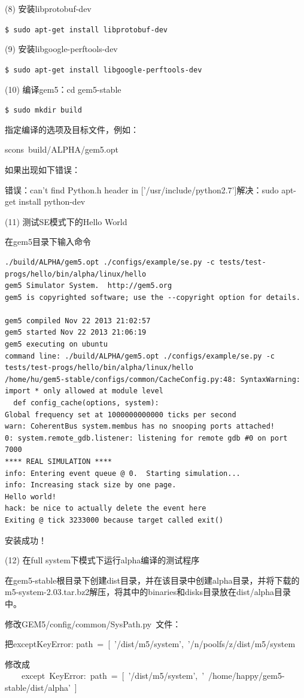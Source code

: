 (8) 安装libprotobuf-dev

\verb"$ sudo apt-get install libprotobuf-dev"

(9)	安装libgoogle-perftools-dev

\verb"$ sudo apt-get install libgoogle-perftools-dev"

(10)	编译gem5：cd gem5-stable

\verb"$ sudo mkdir build"

指定编译的选项及目标文件，例如：

scons build/ALPHA/gem5.opt

如果出现如下错误：

错误：can't find Python.h header in ['/usr/include/python2.7']解决：sudo apt-get install python-dev

(11) 测试SE模式下的Hello World

在gem5目录下输入命令
\begin{verbatim}
./build/ALPHA/gem5.opt ./configs/example/se.py -c tests/test-progs/hello/bin/alpha/linux/hello 
gem5 Simulator System.  http://gem5.org
gem5 is copyrighted software; use the --copyright option for details.

gem5 compiled Nov 22 2013 21:02:57
gem5 started Nov 22 2013 21:06:19
gem5 executing on ubuntu
command line: ./build/ALPHA/gem5.opt ./configs/example/se.py -c tests/test-progs/hello/bin/alpha/linux/hello
/home/hu/gem5-stable/configs/common/CacheConfig.py:48: SyntaxWarning: import * only allowed at module level
  def config_cache(options, system):
Global frequency set at 1000000000000 ticks per second
warn: CoherentBus system.membus has no snooping ports attached!
0: system.remote_gdb.listener: listening for remote gdb #0 on port 7000
**** REAL SIMULATION ****
info: Entering event queue @ 0.  Starting simulation...
info: Increasing stack size by one page.
Hello world!
hack: be nice to actually delete the event here
Exiting @ tick 3233000 because target called exit()
\end{verbatim}
安装成功！

(12) 在full system下模式下运行alpha编译的测试程序

在gem5-stable根目录下创建dist目录，并在该目录中创建alpha目录，并将下载的m5-system-2.03.tar.bz2解压，将其中的binaries和disks目录放在dist/alpha目录中。

修改GEM5/config/common/SysPath.py 文件：

把exceptKeyError: path = [ '/dist/m5/system', '/n/poolfs/z/dist/m5/system  

修改成  
　　except KeyError: path = [ '/dist/m5/system', ' /home/happy/gem5-stable/dist/alpha' ]

